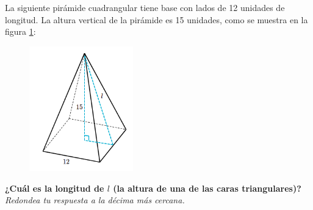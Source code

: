 La siguiente pirámide cuadrangular tiene base con lados de 12 unidades de longitud.
La altura vertical de la pirámide es 15 unidades, como se muestra en la figura \ref{fig:pitagoras3D_piram_03}:\\
\begin{figure}[H]
    \begin{center}
        \includegraphics[width=0.4\textwidth]{../images/pitagoras3D_piram_03.png}
    \end{center}
    \caption{}
    \label{fig:pitagoras3D_piram_03}
\end{figure}
\textbf{¿Cuál es la longitud de $l$ (la altura de una de las caras triangulares)?}\\
\textit{Redondea tu respuesta a la décima más cercana.}
